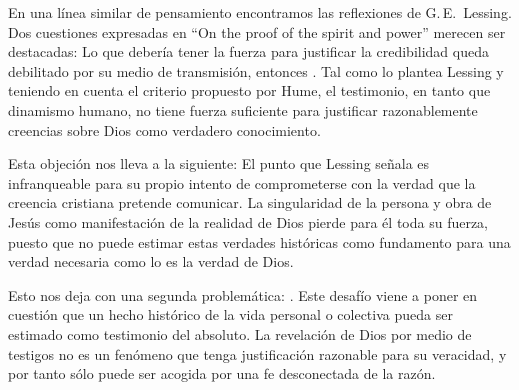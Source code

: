 En una línea similar de pensamiento encontramos las reflexiones de
G.\,E.~Lessing. Dos cuestiones expresadas en ``On the proof of the spirit and
power'' merecen ser destacadas:
Lo que debería tener la fuerza para justificar la credibilidad queda debilitado
por su medio de transmisión, entonces . Tal como lo
plantea Lessing y teniendo en cuenta el criterio propuesto por Hume, el
testimonio, en tanto que dinamismo humano, no tiene fuerza suficiente para
justificar razonablemente creencias sobre Dios como verdadero conocimiento.

Esta objeción nos lleva a la siguiente:
El punto que Lessing señala es infranqueable para su propio intento de
comprometerse con la verdad que la creencia cristiana pretende comunicar. La
singularidad de la persona y obra de Jesús como manifestación de la realidad de
Dios pierde para él toda su fuerza, puesto que no puede estimar estas verdades
históricas como fundamento para una verdad necesaria como lo es la verdad de
Dios.

Esto nos deja con una segunda problemática: \autocite[294]{prades2015testimonio}. Este desafío viene a poner en
cuestión que un hecho histórico de la vida personal o colectiva pueda ser
estimado como testimonio del absoluto. La revelación de Dios por medio de
testigos no es un fenómeno que tenga justificación razonable para su veracidad,
y por tanto sólo puede ser acogida por una fe desconectada de la razón.

